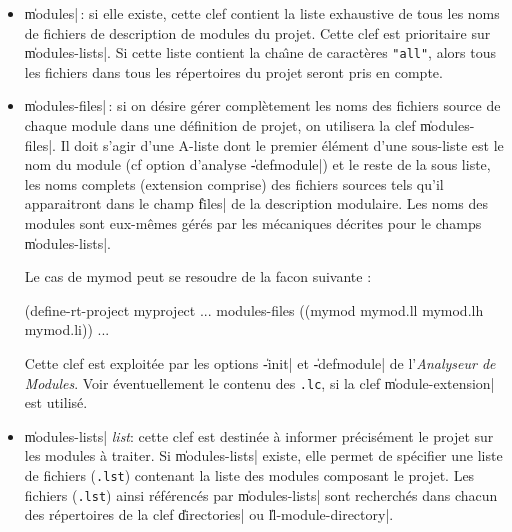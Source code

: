 \begin{itemize}
\begin{itemize}
\end{itemize}
\begin{Side}{\bf Attention} 
L'utilisation de \|module-extension| est d\'{e}conseill\'{e}e
avec l'option d'analyse \|-r|. En effet, une analyse r\'{e}cursive ne
garantit pas la coh\'{e}rence des "{\tt .lc}" avec les "{\tt .lm}",
cette garantie \'{e}tant r\'{e}alis\'{e}e par le {\tt Makefile} d'analyse, 
\end{Side}

\item {\Large \|modules|}\,: si elle existe, cette clef contient la
liste exhaustive de tous les noms de fichiers de description de
modules du projet. Cette clef est prioritaire sur \|modules-lists|.
Si cette liste contient la cha\^{\i}ne de caract\`{e}res
{\tt "all"}, alors tous les fichiers dans tous les r\'{e}pertoires du
projet seront pris en compte.

\item {\Large \|modules-files|}\,: si on d\'{e}sire g\'{e}rer compl\`{e}tement 
les noms des fichiers source de chaque module dans une
d\'{e}finition de projet, on utilisera la clef \|modules-files|. Il doit
s'agir d'une A-liste dont le premier \'{e}l\'{e}ment d'une sous-liste
est le nom du module (cf
option d'analyse \|-defmodule|) et le reste de la sous liste, les noms
complets (extension comprise) des fichiers sources tels qu'il
apparaitront dans le champ \|files| de la description modulaire.
Les noms des modules sont eux-m\^{e}mes g\'{e}r\'{e}s par les m\'{e}caniques
d\'{e}crites pour le champs \|modules-lists|.
\begin{Code*}
Le cas de mymod peut se resoudre de la facon suivante :

(define-rt-project myproject
  ...
  modules-files ((mymod mymod.ll mymod.lh mymod.li))
  ...
\end{Code*}
Cette clef est exploit\'{e}e par les options \|-init| et \|-defmodule| de
l'{\em Analyseur de Modules}. Voir \'{e}ventuellement le contenu
des {\tt .lc}, si la clef \|module-extension| est utilis\'{e}.

\item {\Large \|modules-lists| {\em list}}: cette clef est
destin\'{e}e \`{a} informer 
pr\'{e}cis\'{e}ment le projet sur les modules \`{a} traiter. 
Si \|modules-lists| existe, elle permet de
sp\'{e}cifier une liste de fichiers ({\tt *.lst}) contenant la liste des modules
composant le projet. Les fichiers ({\tt *.lst})  ainsi r\'{e}f\'{e}renc\'{e}s
par \|modules-lists| 
sont recherch\'{e}s dans chacun des 
r\'{e}pertoires de la clef \|directories| ou \|ll-module-directory|.


\end{itemize}
